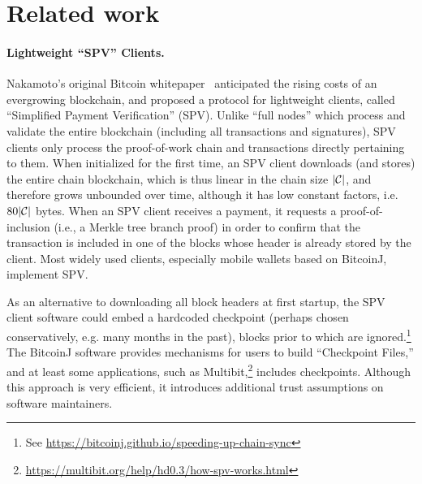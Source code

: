 \section{Related work}

\paragraph{Lightweight ``SPV'' Clients.}
Nakamoto's original Bitcoin whitepaper~\cite{bitcoin} anticipated the rising costs of an evergrowing blockchain, and proposed a protocol for lightweight clients, called ``Simplified Payment Verification'' (SPV). Unlike ``full nodes'' which process and validate the entire blockchain (including all transactions and signatures), SPV clients only process the proof-of-work chain and transactions directly pertaining to them.
When initialized for the first time, an SPV client downloads (and stores) the
entire chain blockchain, which is thus linear in the chain size $|\mathcal{C}|$, and
therefore grows unbounded over time, although it has low constant factors, i.e.
$80|\mathcal{C}|$ bytes.
When an SPV client receives a payment, it requests a proof-of-inclusion (i.e., a Merkle tree branch proof) in order to confirm that the transaction is included in one of the blocks whose header is already stored by the client.
Most widely used clients, especially mobile wallets based on BitcoinJ, implement SPV. 


As an alternative to downloading all block headers at first startup, the SPV client software could embed a hardcoded checkpoint (perhaps chosen conservatively, e.g. many months in the past), blocks prior to which are ignored.\footnote{See \url{https://bitcoinj.github.io/speeding-up-chain-sync}} The BitcoinJ software provides mechanisms for users to build ``Checkpoint Files,'' and at least some applications, such as Multibit,\footnote{\url{https://multibit.org/help/hd0.3/how-spv-works.html}} includes checkpoints. Although this approach is very efficient, it introduces additional trust assumptions on software maintainers. 

